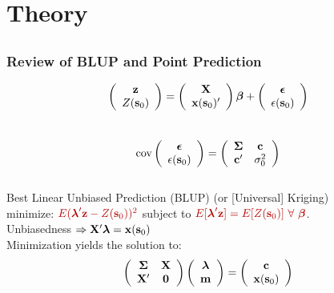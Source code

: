 \documentclass[mathserif,compress]{beamer}\usepackage{graphicx, color}
\def\bc{\mathbf{c}}
\def\bm{\mathbf{m}}
\def\bs{\mathbf{s}}
\def\bx{\mathbf{x}}
\def\bz{\mathbf{z}}
\def\bX{\mathbf{X}}
\def\bbeta{\mbox{\boldmath $\beta$}}
\def\bepsilon{\mbox{\boldmath $\epsilon$}}
\def\blambda{\mbox{\boldmath $\lambda$}}
\def\bSigma{\mbox{\boldmath $\Sigma$}}
\def\cov{\textrm{cov}}
\def\bzero{\mathbf{0}}
\def\upp{^\prime}
\newcommand{\cre}[1]{\color{red!70!black}#1}
\begin{document}

\section{Theory}
\subsection{}
\begin{frame}[fragile]
\frametitle{Review of BLUP and Point Prediction}
	\vspace{-.5cm}
	\[
		\left(\begin{array}{c}
		\bz \\ Z(\bs_0)
		\end{array}\right)	=
		\left(\begin{array}{c}
		\bX \\ \bx(\bs_0)\upp
		\end{array}\right)\bbeta +
		\left(\begin{array}{c}
		\bepsilon \\ \epsilon(\bs_0)
		\end{array}\right)
	\] \\
	\[ 
		\cov\left(\begin{array}{c}
		\bepsilon \\ \epsilon(\bs_0)
		\end{array}\right) = 
		\left(\begin{array}{cc}
		\bSigma & \bc \\ \bc\upp & \sigma_0^2
		\end{array}\right)
	\]
	 \\
	Best Linear Unbiased Prediction (BLUP) (or [Universal] Kriging) \\
	minimize: $\cre{E(\blambda\upp\bz - Z(\bs_0))^2}$ subject to 	$\cre{E[\blambda\upp\bz] = E[Z(\bs_0)]}  \ \forall \ \bbeta$. \\
	Unbiasedness $\Rightarrow \bX\upp\blambda = \bx(\bs_0)$ \\		
	Minimization yields the solution to:
	\[
		\left(\begin{array}{cc}
		\bSigma & \bX \\ \bX\upp & \bzero
		\end{array}\right)
		\left(\begin{array}{c}
		\blambda \\ \bm
		\end{array}\right) =
		\left(\begin{array}{c}
		\bc \\ \bx(\bs_0)
		\end{array}\right)
	\]
	 

\end{frame}
\end{document}
